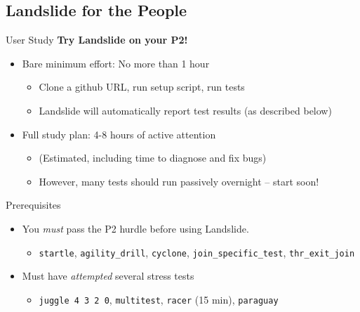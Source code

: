 \documentclass[xcolor=dvipsnames]{beamer}
\begin{document}
\subsection{Landslide for the People}

\begin{frame}{User Study}
	\textbf{Try Landslide on your P2!}
	\begin{itemize}
		\item Bare minimum effort: No more than 1 hour
		\begin{itemize}
			\item Clone a github URL, run setup script, run tests %
			\item Landslide will automatically report test results (as described below)
		\end{itemize}
		\item Full study plan: 4-8 hours of active attention
		\begin{itemize}
			\item (Estimated, including time to diagnose and fix bugs)
			\item However, many tests should run passively overnight -- start soon!
		\end{itemize}
	\end{itemize}
	\pause
	\linegap

	Prerequisites
	\begin{itemize}
		\item You {\em must} pass the P2 hurdle before using Landslide.
		\begin{itemize}
			\item {\tt startle}, {\tt agility\_drill}, {\tt cyclone}, {\tt join\_specific\_test}, {\tt thr\_exit\_join}
		\end{itemize}
		\item Must have {\em attempted} several stress tests
		\begin{itemize}
			\item {\tt juggle 4 3 2 0}, {\tt multitest}, {\tt racer} (15 min), {\tt paraguay}
		\end{itemize}

	\end{itemize}
\end{frame}
\end{document}
